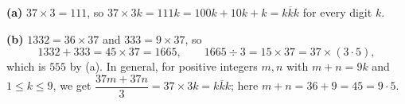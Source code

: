 \textbf{(a)} $37\times3=111$, so $37\times3k=111k=100k+10k+k=\overline{kkk}$ for every digit $k$.

\textbf{(b)} $1332=36\times37$ and $333=9\times37$, so
\[1332+333=45\times37=1665,\qquad 1665\div3=15\times37=37\times(3\cdot5),\]
which is $\boxed{555}$ by (a). In general, for positive integers $m,n$ with $m+n=9k$ and $1\le k\le9$, we get $\dfrac{37m+37n}{3}=37\times3k=\overline{kkk}$; here $m+n=36+9=45=9\cdot5$.
